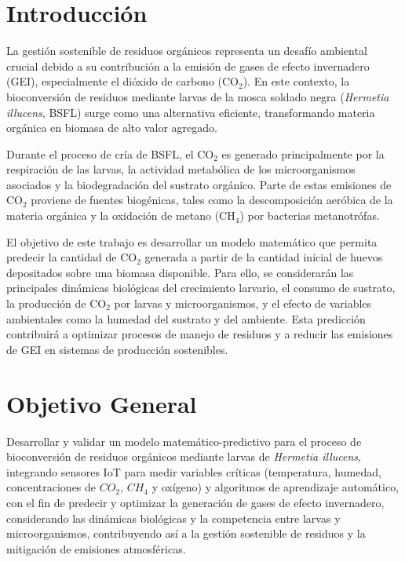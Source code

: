 \section{Introducci\'on}

La gesti\'on sostenible de residuos org\'anicos representa un desaf\'io ambiental crucial debido a su contribuci\'on a la emisi\'on de gases de efecto invernadero (GEI), especialmente el di\'oxido de carbono (CO$_2$). En este contexto, la bioconversi\'on de residuos mediante larvas de la mosca soldado negra (\textit{Hermetia illucens}, BSFL) surge como una alternativa eficiente, transformando materia org\'anica en biomasa de alto valor agregado.

Durante el proceso de cr\'ia de BSFL, el CO$_2$ es generado principalmente por la respiraci\'on de las larvas, la actividad metab\'olica de los microorganismos asociados y la biodegradaci\'on del sustrato org\'anico. Parte de estas emisiones de CO$_2$ proviene de fuentes biog\'enicas, tales como la descomposici\'on aer\'obica de la materia org\'anica y la oxidaci\'on de metano (CH$_4$) por bacterias metanotr\'ofas.

El objetivo de este trabajo es desarrollar un modelo matem\'atico que permita predecir la cantidad de CO$_2$ generada a partir de la cantidad inicial de huevos depositados sobre una biomasa disponible. Para ello, se considerar\'an las principales din\'amicas biol\'ogicas del crecimiento larvario, el consumo de sustrato, la producci\'on de CO$_2$ por larvas y microorganismos, y el efecto de variables ambientales como la humedad del sustrato y del ambiente. Esta predicci\'on contribuir\'a a optimizar procesos de manejo de residuos y a reducir las emisiones de GEI en sistemas de producci\'on sostenibles.

\section*{Objetivo General}

Desarrollar y validar un modelo matemático-predictivo para el proceso de bioconversión de residuos orgánicos mediante larvas de \textit{Hermetia illucens}, integrando sensores IoT para medir variables críticas (temperatura, humedad, concentraciones de $CO_2$, $CH_4$ y oxígeno) y algoritmos de aprendizaje automático, con el fin de predecir y optimizar la generación de gases de efecto invernadero, considerando las dinámicas biológicas y la competencia entre larvas y microorganismos, contribuyendo así a la gestión sostenible de residuos y la mitigación de emisiones atmosféricas.
